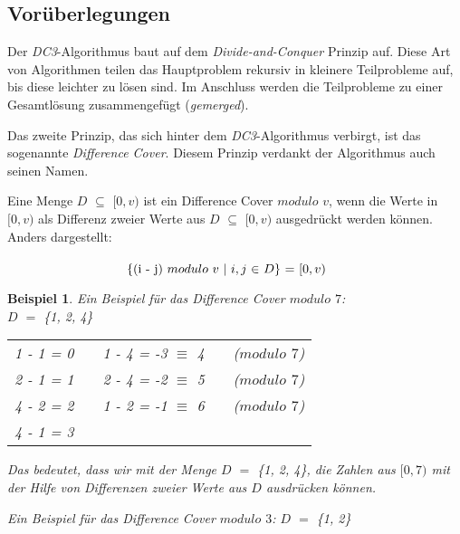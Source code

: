 \subsection{Vorüberlegungen}
\label{dc3:vorueberlegungen}

\newtheorem{example}{Beispiel}
Der \emph{DC3}-Algorithmus baut auf dem \emph{Divide-and-Conquer} Prinzip auf. Diese Art von Algorithmen teilen das Hauptproblem rekursiv in kleinere Teilprobleme auf, bis diese leichter zu lösen sind. Im Anschluss werden die Teilprobleme zu einer Gesamtlösung zusammengefügt (\emph{gemerged}).

Das zweite Prinzip, das sich hinter dem \emph{DC3}-Algorithmus verbirgt, ist das sogenannte \emph{Difference Cover}. Diesem Prinzip verdankt der Algorithmus auch seinen Namen.

\begin{definition}
	\label{def:differenceCover}
	Eine Menge \(D\) $\subseteq$ \([0,v)\) ist ein Difference Cover \(modulo\) \(v\), wenn die Werte in \([0,v)\) als Differenz zweier Werte aus \(D\) $\subseteq$ \([0,v)\) ausgedrückt werden können. Anders dargestellt:\\ \\
	$\makebox[\linewidth]{\{(i - j) \(modulo\) \(v\) $\mid$ $i,j$ $\in$ \(D\)\} $=$ \([0,v)\)}$
			
\end{definition}

\begin{example}
	Ein Beispiel für das Difference Cover \(modulo\) \(7\):\\
	\(D\) $=$ \{1, 2, 4\} 
	\begin{table}[!htbp]
		\centering
		\begin{tabular}{lllll}
			1 - 1 = 0 &  & 1 - 4 = -3 $\equiv$ 4 &  & (\(modulo\) \(7\))\\
			2 - 1 = 1 &  & 2 - 4 = -2 $\equiv$ 5 &  & (\(modulo\) \(7\))\\
			4 - 2 = 2 &  & 1 - 2 = -1 $\equiv$ 6 &  & (\(modulo\) \(7\))\\
			4 - 1 = 3 &  &                       &  & 
		\end{tabular}
	\end{table}
	
	Das bedeutet, dass wir mit der Menge \(D\) $=$ \{1, 2, 4\}, die Zahlen aus \([0,7)\) mit der Hilfe von Differenzen zweier Werte aus \(D\) ausdrücken können.
	
	Ein Beispiel für das Difference Cover \(modulo\) \(3\): \(D\) $=$ \{1, 2\} 
\end{example}
